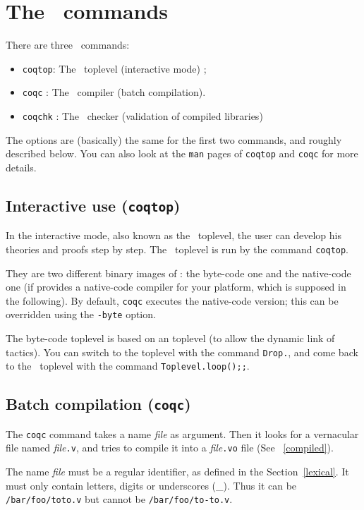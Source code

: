 \chapter[The \Coq~commands]{The \Coq~commands\label{Addoc-coqc}
}

There are three \Coq~commands: 
\begin{itemize}
\item {\tt coqtop}: The \Coq\ toplevel (interactive mode) ; 
\item {\tt coqc} : The \Coq\ compiler (batch compilation).
\item {\tt coqchk} : The \Coq\ checker (validation of compiled libraries)
\end{itemize}
The options are (basically) the same for the first two commands, and
roughly described below. You can also look at the \verb!man! pages of
\verb!coqtop! and \verb!coqc! for more details.


\section{Interactive use ({\tt coqtop})}

In the interactive mode, also known as the \Coq~toplevel, the user can
develop his theories and proofs step by step.  The \Coq~toplevel is
run by the command {\tt coqtop}. 

\label{binary-images}
They are two different binary images of \Coq: the byte-code one and
the native-code one (if {\ocaml} provides a native-code compiler
for your platform, which is supposed in the following). By default,
\verb!coqc! executes the native-code version; this can be overridden
using the \verb!-byte! option.

The byte-code toplevel is based on an {\ocaml}
toplevel (to allow the dynamic link of tactics).  You can switch to
the {\ocaml} toplevel with the command \verb!Drop.!, and come back to the
\Coq~toplevel with the command \verb!Toplevel.loop();;!.

\section{Batch compilation ({\tt coqc})}
The {\tt coqc} command takes a name {\em file} as argument.  Then it
looks for a vernacular file named {\em file}{\tt .v}, and tries to
compile it into a {\em file}{\tt .vo} file (See ~\ref{compiled}).

\Warning The name {\em file} must be a regular {\Coq} identifier, as
defined in the Section~\ref{lexical}. It
must only contain letters, digits or underscores
(\_). Thus it can be \verb+/bar/foo/toto.v+ but cannot be
\verb+/bar/foo/to-to.v+.

